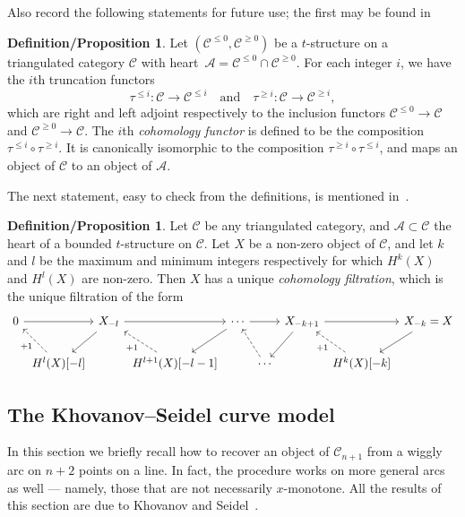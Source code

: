 \documentclass{amsart}
\theoremstyle{definition}
\newtheorem{defprop}[theorem]{Definition/Proposition}
\newcommand{\darkblue}{\color{darkblue}} %
\newcommand{\defn}[1]{\textsl{\darkblue #1}} %
\newcommand{\vincent}[1]{\todo[color=blue!30]{\rm #1 \\ \hfill --- V.}}
\begin{document}
Also record the following statements for future use; the first may be found in~\cite[1.3]{bel.ber.del:82}
\vincent{is that a section?}
\begin{defprop}\label{defprop:cohomology}
  Let \((\mathcal{C}^{\le 0}, \mathcal{C}^{\geq 0})\) be a \(t\)-structure on a triangulated category \(\mathcal{C}\) with heart~\(\mathcal{A} = \mathcal{C}^{\leq 0} \cap \mathcal{C}^{\geq 0}\).
  For each integer \(i\), we have the \(i\)th truncation functors
  \[\tau^{\leq i} \colon \mathcal{C} \to \mathcal{C}^{\leq i} \quad\text{and}\quad \tau^{\geq i} \colon \mathcal{C} \to \mathcal{C}^{\geq i},\]
  which are right and left adjoint respectively to the inclusion functors \(\mathcal{C}^{\leq 0} \to \mathcal{C}\) and \(\mathcal{C}^{\geq 0} \to \mathcal{C}\).
  The \(i\)th \defn{cohomology functor} is defined to be the composition \(\tau^{\leq i} \circ \tau^{\geq i}\).
  It is canonically isomorphic to the composition \(\tau^{\geq i} \circ \tau^{\leq i}\), and maps an object of \(\mathcal{C}\) to an object of \(\mathcal{A}\).
\end{defprop}
The next statement, easy to check from the definitions, is mentioned in~\cite[Sect.~3.3]{bayer2011tour}.
\begin{defprop}\label{defprop:cohomology-filtration}
  Let \(\mathcal{C}\) be any triangulated category, and \(\mathcal{A} \subset \mathcal{C}\) the heart of a bounded \(t\)-structure on \(\mathcal{C}\).
  Let \(X\) be a non-zero object of \(\mathcal{C}\), and let \(k\) and \(l\) be the maximum and minimum integers respectively for which \(H^k(X)\) and \(H^{l}(X)\) are non-zero.
  Then \(X\) has a unique \defn{cohomology filtration}, which is the unique filtration of the form
  \[
    \begin{tikzcd}[column sep=0.1cm]
      0  \arrow{rr} && X_{-l} \arrow{dl} \arrow{rr} && \cdots \arrow{rr} \arrow{dl} && X_{-k+1} \arrow{rr} \arrow{dl} && X_{-k} = X \arrow{dl}\\
      & H^l(X)[-l] \arrow[dashed]{ul}{+1} && H^{l+1}(X)[-l-1] \arrow[dashed]{ul}{+1} && \cdots \arrow[dashed]{ul} &&H^k(X)[-k] \arrow[dashed]{ul}{+1}
    \end{tikzcd}
  \]  
\end{defprop}


\subsection{The Khovanov--Seidel curve model}
In this section we briefly recall how to recover an object of \(\mathcal{C}_{n+1}\) from a wiggly arc on \(n+2\) points on a line.
In fact, the procedure works on more general arcs as well --- namely, those that are not necessarily \(x\)-monotone.
All the results of this section are due to Khovanov and Seidel~\cite{kho.sei:02}.
\end{document}
